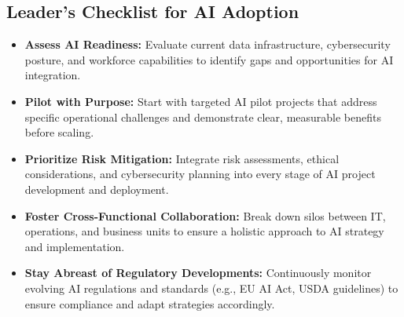 \subsection{Leader's Checklist for AI Adoption}
\begin{itemize}
    \item \textbf{Assess AI Readiness:} Evaluate current data infrastructure, cybersecurity posture, and workforce capabilities to identify gaps and opportunities for AI integration.
    \item \textbf{Pilot with Purpose:} Start with targeted AI pilot projects that address specific operational challenges and demonstrate clear, measurable benefits before scaling.
    \item \textbf{Prioritize Risk Mitigation:} Integrate risk assessments, ethical considerations, and cybersecurity planning into every stage of AI project development and deployment.
    \item \textbf{Foster Cross-Functional Collaboration:} Break down silos between IT, operations, and business units to ensure a holistic approach to AI strategy and implementation.
    \item \textbf{Stay Abreast of Regulatory Developments:} Continuously monitor evolving AI regulations and standards (e.g., EU AI Act, USDA guidelines) to ensure compliance and adapt strategies accordingly.
\end{itemize}
